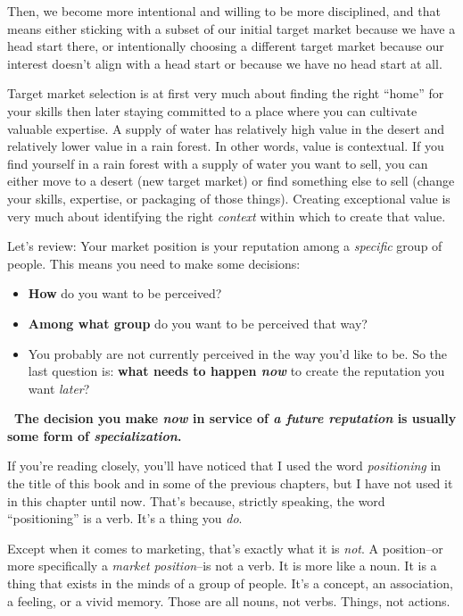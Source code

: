 Then, we become more intentional and willing to be more disciplined, and that means either sticking with a subset of our initial target market because we have a head start there, or intentionally choosing a different target market because our interest doesn't align with a head start or because we have no head start at all.

Target market selection is at first very much about finding the right ``home'' for your skills then later staying committed to a place where you can cultivate valuable expertise. A supply of water has relatively high value in the desert and relatively lower value in a rain forest. In other words, value is contextual. If you find yourself in a rain forest with a supply of water you want to sell, you can either move to a desert (new target market) or find something else to sell (change your skills, expertise, or packaging of those things). Creating exceptional value is very much about identifying the right \emph{context} within which to create that value.

Let's review: Your market position is your reputation among a \emph{specific} group of people. This means you need to make some decisions:

\begin{itemize}
\item \textbf{How} do you want to be perceived?
\item \textbf{Among what group} do you want to be perceived that way?
\item You probably are not currently perceived in the way you'd like to be. So the last question is: \textbf{what needs to happen \emph{now}} to create the reputation you want \emph{later}?
\end{itemize}

\textbf{ The decision you make \emph{now} in service of \emph{a future reputation} is usually some form of \emph{specialization}.}

If you're reading closely, you'll have noticed that I used the word \emph{positioning} in the title of this book and in some of the previous chapters, but I have not used it in this chapter until now. That's because, strictly speaking, the word ``positioning'' is a verb. It's a thing you \emph{do}.

Except when it comes to marketing, that's exactly what it is \emph{not}. A position--or more specifically a \emph{market position}--is not a verb. It is more like a noun. It is a thing that exists in the minds of a group of people. It's a concept, an association, a feeling, or a vivid memory. Those are all nouns, not verbs. Things, not actions.

